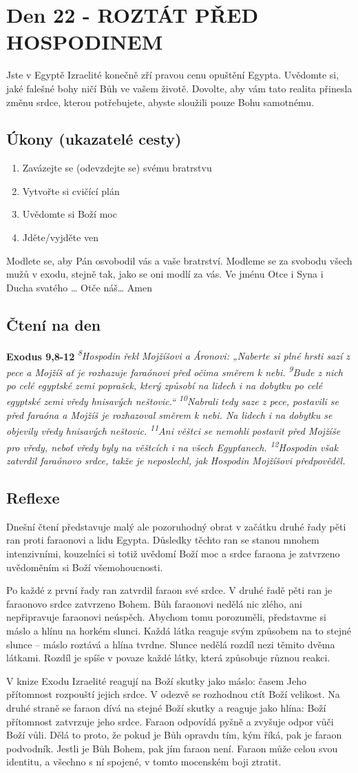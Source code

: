 \documentclass[11pt]{article}
\newcommand{\zacatekCtvrtyTyden}{
  Jste v Egyptě \newline
  Izraelité konečně zří pravou cenu opuštění Egypta. Uvědomte si, jaké falešné bohy ničí Bůh ve vašem životě.
Dovolte, aby vám tato realita přinesla změnu srdce, kterou potřebujete, abyste sloužili pouze Bohu samotnému.

\subsection*{Úkony (ukazatelé cesty)}
\begin{enumerate}
  \item Zavázejte se (odevzdejte se) svému bratrstvu
  \item Vytvořte si cvičící plán
  \item Uvědomte si Boží moc
  \item Jděte/vyjděte ven
\end{enumerate}
Modlete se, aby Pán osvobodil vás a vaše bratrství. \newline
Modleme se za svobodu všech mužů v exodu, stejně tak, jako se oni modlí za vás.\newline
Ve jménu Otce i Syna i Ducha svatého …  Otče náš… Amen
}
\begin{document}
\newpage
\section{Den 22 - ROZTÁT PŘED HOSPODINEM}
\zacatekCtvrtyTyden
\subsection*{Čtení na den}
\textbf{Exodus 9,8-12}
\newline
\textit{
\textsuperscript{8}Hospodin řekl Mojžíšovi a Áronovi: „Naberte si plné hrsti sazí z pece a Mojžíš ať je rozhazuje faraónovi před očima směrem k nebi.
\textsuperscript{9}Bude z nich po celé egyptské zemi poprašek, který způsobí na lidech i na dobytku po celé egyptské zemi vředy hnisavých neštovic.“
\textsuperscript{10}Nabrali tedy saze z pece, postavili se před faraóna a Mojžíš je rozhazoval směrem k nebi. Na lidech i na dobytku se objevily vředy hnisavých neštovic.
\textsuperscript{11}Ani věštci se nemohli postavit před Mojžíše pro vředy, neboť vředy byly na věštcích i na všech Egypťanech.
\textsuperscript{12}Hospodin však zatvrdil faraónovo srdce, takže je neposlechl, jak Hospodin Mojžíšovi předpověděl.
}

\subsection*{Reflexe}

Dnešní čtení představuje malý ale pozoruhodný obrat v začátku druhé řady pěti ran proti faraonovi a lidu Egypta.
Důsledky těchto ran se stanou mnohem intenzivními, kouzelníci si totiž uvědomí Boží moc a srdce faraona je
zatvrzeno uvědoměním si Boží všemohoucnosti.

Po každé z první řady ran zatvrdil faraon své srdce. V druhé řadě pěti ran je faraonovo srdce zatvrzeno Bohem. Bůh
faraonovi nedělá nic zlého, ani nepřipravuje faraonovi neúspěch. Abychom tomu porozuměli, představme si máslo
a hlínu na horkém slunci. Každá látka reaguje svým způsobem na to stejné slunce – máslo roztává a hlína tvrdne.
Slunce nedělá rozdíl nezi těmito dvěma látkami. Rozdíl je spíše v povaze každé látky, která způsobuje různou
reakci.

V knize Exodu Izraelité reagují na Boží skutky jako máslo: časem Jeho přítomnost rozpouští jejich srdce. V odezvě
se rozhodnou ctít Boží velikost. Na druhé straně se faraon dívá na stejné Boží skutky a reaguje jako hlína: Boží
přítomnost zatvrzuje jeho srdce. Faraon odpovídá pyšně a zvyšuje odpor vůči Boží vůli. Dělá to proto, že pokud je
Bůh opravdu tím, kým říká, pak je faraon podvodník. Jestli je Bůh Bohem, pak jím faraon není. Faraon může celou
svou identitu, a všechno s ní spojené, v tomto mocenském boji ztratit.
\end{document}
